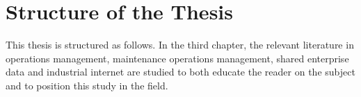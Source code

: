 
%





\section{Structure of the Thesis}
\label{section:structure} 

This thesis is structured as follows. In the third chapter, the relevant literature in operations management, maintenance operations management, shared enterprise data and industrial internet are studied to both educate the reader on the subject and to position this study in the field.


